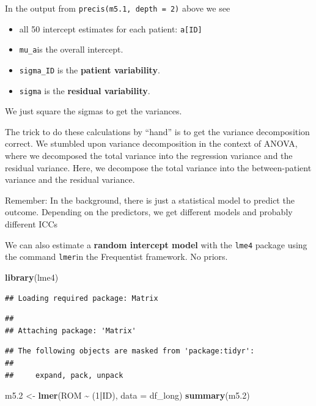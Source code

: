 \documentclass[
]{book}
\newenvironment{Shaded}{\begin{snugshade}}{\end{snugshade}}
\newcommand{\AttributeTok}[1]{\textcolor[rgb]{0.13,0.29,0.53}{#1}}
\newcommand{\DecValTok}[1]{\textcolor[rgb]{0.00,0.00,0.81}{#1}}
\newcommand{\FloatTok}[1]{\textcolor[rgb]{0.00,0.00,0.81}{#1}}
\newcommand{\FunctionTok}[1]{\textcolor[rgb]{0.13,0.29,0.53}{\textbf{#1}}}
\newcommand{\NormalTok}[1]{#1}
\newcommand{\OtherTok}[1]{\textcolor[rgb]{0.56,0.35,0.01}{#1}}
\newcommand{\SpecialCharTok}[1]{\textcolor[rgb]{0.81,0.36,0.00}{\textbf{#1}}}
\providecommand{\tightlist}{%
  \setlength{\itemsep}{0pt}\setlength{\parskip}{0pt}}
\begin{document}
In the output from \texttt{precis(m5.1,\ depth\ =\ 2)} above we see

\begin{itemize}
\tightlist
\item
  all 50 intercept estimates for each patient: \texttt{a{[}ID{]}}
\item
  \texttt{mu\_a}is the overall intercept.
\item
  \texttt{sigma\_ID} is the \textbf{patient variability}.
\item
  \texttt{sigma} is the \textbf{residual variability}.
\end{itemize}

We just square the sigmas to get the variances.

The trick to do these calculations by ``hand'' is to get the
variance decomposition correct.
We stumbled upon variance decomposition in the context of ANOVA,
where we decomposed the total variance into the regression variance
and the residual variance. Here, we decompose the total variance
into the between-patient variance and the residual variance.

Remember: In the background, there is just a statistical model to predict
the outcome. Depending on the predictors, we get different models and
probably different ICCs

We can also estimate a \textbf{random intercept model} with the \texttt{lme4} package using
the command \texttt{lmer}in the Frequentist framework. No priors.

\begin{Shaded}
\begin{Highlighting}[]
\FunctionTok{library}\NormalTok{(lme4)}
\end{Highlighting}
\end{Shaded}

\begin{verbatim}
## Loading required package: Matrix
\end{verbatim}

\begin{verbatim}
## 
## Attaching package: 'Matrix'
\end{verbatim}

\begin{verbatim}
## The following objects are masked from 'package:tidyr':
## 
##     expand, pack, unpack
\end{verbatim}

\begin{Shaded}
\begin{Highlighting}[]
\NormalTok{m5}\FloatTok{.2} \OtherTok{\textless{}{-}} \FunctionTok{lmer}\NormalTok{(ROM }\SpecialCharTok{\textasciitilde{}}\NormalTok{ (}\DecValTok{1}\SpecialCharTok{|}\NormalTok{ID), }\AttributeTok{data =}\NormalTok{ df\_long)}
\FunctionTok{summary}\NormalTok{(m5}\FloatTok{.2}\NormalTok{)}
\end{Highlighting}
\end{Shaded}
\end{document}
